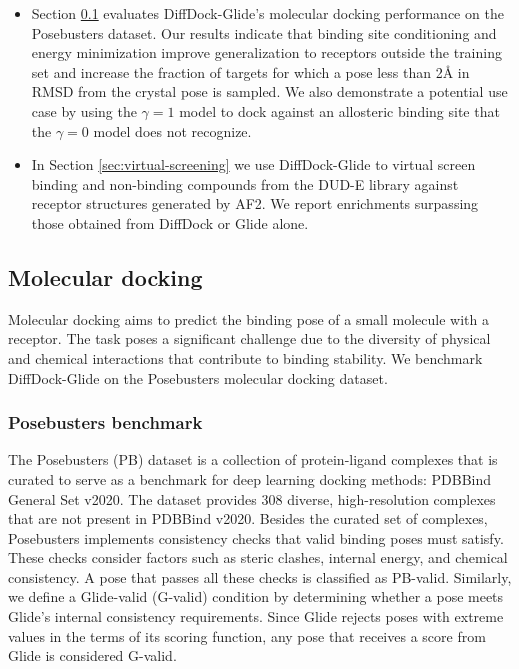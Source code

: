 \documentclass[%
 aip,
 amsmath,amssymb,
reprint,%
]{revtex4-1}
\begin{document}
\begin{itemize}
    \item Section \ref{sec:molecular-docking} evaluates DiffDock-Glide's molecular docking performance on the Posebusters dataset. Our results indicate that binding site conditioning and energy minimization improve generalization to receptors outside the training set and increase the fraction of targets for which a pose less than 2{\AA} in RMSD from the crystal pose is sampled. We also demonstrate a potential use case by using the $\gamma=1$ model to dock against an allosteric binding site that the $\gamma=0$ model does not recognize.
    
    \item In Section \ref{sec:virtual-screening} we use DiffDock-Glide to virtual screen binding and non-binding compounds from the DUD-E library against receptor structures generated by AF2. We report enrichments surpassing those obtained from DiffDock or Glide alone.

\end{itemize}

\subsection{Molecular docking}
\label{sec:molecular-docking}
Molecular docking aims to predict the binding pose of a small molecule with a receptor. The task poses a significant challenge due to the diversity of physical and chemical interactions that contribute to binding stability. We benchmark DiffDock-Glide on the Posebusters molecular docking dataset.\cite{buttenschoen2024posebusters}

\subsubsection{Posebusters benchmark}
The Posebusters (PB) dataset is a collection of protein-ligand complexes that is curated to serve as a benchmark for deep learning docking methods: PDBBind General Set v2020.\cite{buttenschoen2024posebusters} The dataset provides 308 diverse, high-resolution complexes that are not present in PDBBind v2020. Besides the curated set of complexes, Posebusters implements consistency checks that valid binding poses must satisfy. These checks consider factors such as steric clashes, internal energy, and chemical consistency. A pose that passes all these checks is classified as PB-valid. Similarly, we define a Glide-valid (G-valid) condition by determining whether a pose meets Glide’s internal consistency requirements. Since Glide rejects poses with extreme values in the terms of its scoring function, any pose that receives a score from Glide is considered G-valid.
\end{document}
